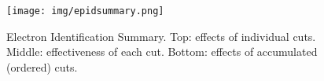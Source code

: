 \begin{figure}[hb]
  \centering
		\texttt{[image: img/epidsummary.png]}
		\caption{Electron Identification Summary. Top: effects of individual cuts.
		         Middle: effectiveness of each cut.
               Bottom: effects of accumulated (ordered) cuts.}
 		\label{fig:epidsummary}
\end{figure}













